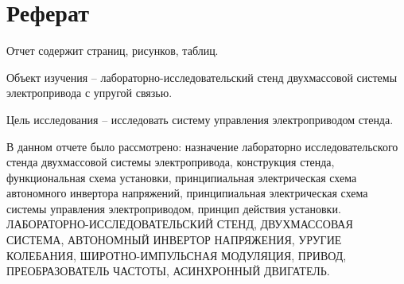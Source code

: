 \section*{Реферат}
    Отчет содержит  страниц,  рисунков,  таблиц.
    
    Объект изучения -- лабораторно-исследовательский стенд двухмассовой системы электропривода с упругой связью.
    
    Цель исследования -- исследовать систему управления электроприводом стенда.

    В данном отчете было рассмотрено: назначение
    лабораторно исследовательского стенда двухмассовой системы
    электропривода, конструкция стенда, функциональная схема установки,
    принципиальная электрическая схема автономного инвертора напряжений,
    принципиальная электрическая схема системы управления электроприводом,
    принцип действия установки.\\ 

    \MakeTextUppercase{%
        Лабораторно-исследовательский стенд, двухмассовая система, автономный инвертор напряжения, уругие колебания, 
        широтно-импульсная модуляция, привод, преобразователь частоты, асинхронный двигатель.
    }
